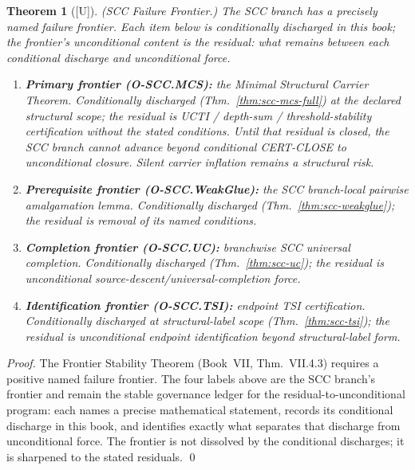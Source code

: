 \documentclass[12pt,oneside]{amsbook}
\theoremstyle{plain}
\newtheorem{theorem}{Theorem}[section]
\theoremstyle{definition}
\theoremstyle{remark}
\newcommand{\status}[1]{\textup{[#1]}}
\begin{document}
\begin{theorem}[\status{U}]\label{thm:scc-frontier}
\textup{(SCC Failure Frontier.)} The SCC branch has a precisely
named failure frontier. Each item below is conditionally discharged
in this book; the frontier's unconditional content is the
\emph{residual}: what remains between each conditional discharge and
unconditional force.
\begin{enumerate}[label=\textup{(\roman*)}]
 \item \textbf{Primary frontier (O-SCC.MCS):} the Minimal
 Structural Carrier Theorem. Conditionally discharged
 (Thm.~\ref{thm:scc-mcs-full}) at the declared structural scope;
 the residual is UCTI / depth-sum / threshold-stability
 certification \emph{without} the stated conditions. Until that
 residual is closed, the SCC branch cannot advance beyond
 conditional CERT-CLOSE to unconditional closure. Silent carrier
 inflation remains a structural risk.
 \item \textbf{Prerequisite frontier (O-SCC.WeakGlue):}
 the SCC branch-local pairwise amalgamation lemma. Conditionally
 discharged (Thm.~\ref{thm:scc-weakglue}); the residual is removal
 of its named conditions.
 \item \textbf{Completion frontier (O-SCC.UC):} branchwise
 SCC universal completion. Conditionally discharged
 (Thm.~\ref{thm:scc-uc}); the residual is unconditional
 source-descent/universal-completion force.
 \item \textbf{Identification frontier (O-SCC.TSI):} endpoint TSI
 certification. Conditionally discharged at structural-label scope
 (Thm.~\ref{thm:scc-tsi}); the residual is unconditional endpoint
 identification beyond structural-label form.
\end{enumerate}
\end{theorem}

\begin{proof}
The Frontier Stability Theorem (Book~VII, Thm.~VII.4.3) requires
a positive named failure frontier. The four labels above are the
SCC branch's frontier and remain the stable governance ledger for
the residual-to-unconditional program: each names a precise
mathematical statement, records its conditional discharge in this
book, and identifies exactly what separates that discharge from
unconditional force. The frontier is not dissolved by the
conditional discharges; it is sharpened to the stated residuals.
\qed
\end{proof}

\end{document}
